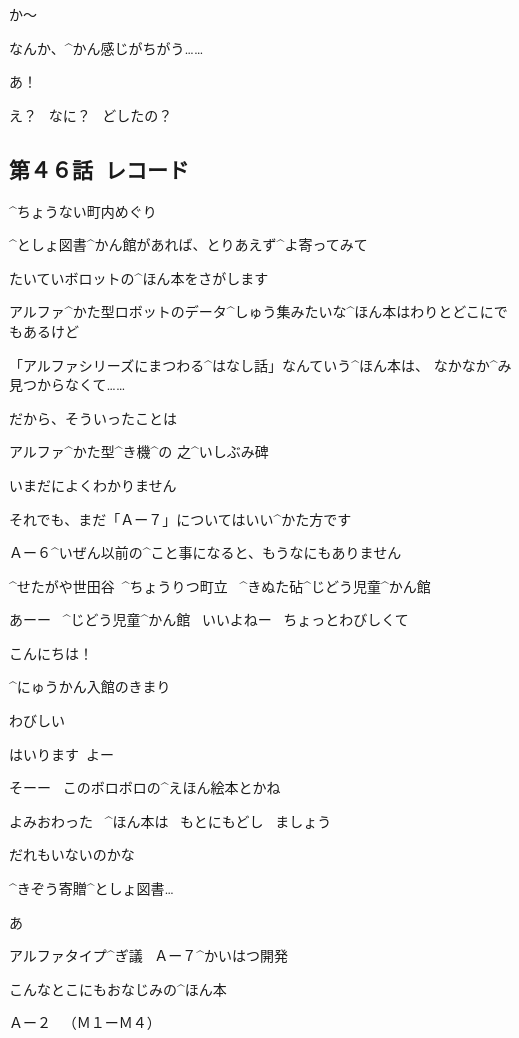 \M か〜

\T なんか、^{かん}{感}じがちがう……

\A あ！

\T え？
\ なに？
\ どしたの？


\subsection{第４６話\ レコード}

\page[44]
\K ^{ちょうない}{町内}めぐり

\K ^{としょ}{図書}^{かん}{館}があれば、とりあえず^{よ}{寄}ってみて

\K たいていボロットの^{ほん}{本}をさがします

\K アルファ^{かた}{型}ロボットのデータ^{しゅう}{集}みたいな^{ほん}{本}はわりとどこにでもあるけど

\K 「アルファシリーズにまつわる^{はなし}{話}」なんていう^{ほん}{本}は、
なかなか^{み}{見}つからなくて……

\page
\K だから、そういったことは

\Sign アルファ^{かた}{型}^{き}{機}^{の }{之}^{いしぶみ}{碑}

\K いまだによくわかりません

\K それでも、まだ「Ａー７」についてはいい^{かた}{方}です

\K Ａー６^{いぜん}{以前}の^{こと}{事}になると、もうなにもありません

\page
\Sign ^{せたがや}{世田谷}\ ^{ちょうりつ}{町立}
\ ^{きぬた}{砧}^{じどう}{児童}^{かん}{館}

\K あーー
\ ^{じどう}{児童}^{かん}{館}
\ いいよねー
\ ちょっとわびしくて

\K こんにちは！

\Sign ^{にゅうかん}{入館}のきまり

\page
\K わびしい

\K はいります\ よー

\K そーー
\ このボロボロの^{えほん}{絵本}とかね

\Sign よみおわった
\ ^{ほん}{本}は
\ もとにもどし
\ ましょう

\page
\K だれもいないのかな

\page
\Sign ^{きぞう}{寄贈}^{としょ}{図書}…

\K あ

\Sign アルファタイプ^{ぎ}{議}
\ Ａー７^{かいはつ}{開発}

\K こんなとこにもおなじみの^{ほん}{本}

\page
\Sign Ａー２
\ （Ｍ１ーＭ４）


